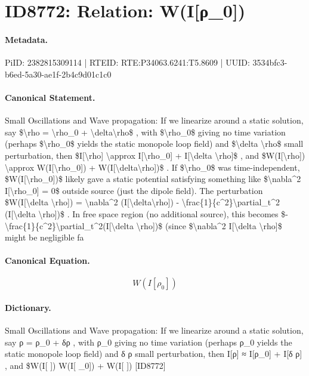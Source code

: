 \section*{ID8772: Relation: W(I[ρ\_0])}
\paragraph{Metadata.}
PiID: 2382815309114 | RTEID: RTE:P34063.6241:T5.8609 | UUID: 3534bfc3-b6ed-5a30-ae1f-2b4c9d01c1c0

\paragraph{Canonical Statement.}
Small Oscillations and Wave propagation: If we linearize around a static solution, say \$\textbackslash{}rho = \textbackslash{}rho\_0 + \textbackslash{}delta\textbackslash{}rho\$ , with \$\textbackslash{}rho\_0\$ giving no time variation (perhaps \$\textbackslash{}rho\_0\$ yields the static monopole loop field) and \$\textbackslash{}delta \textbackslash{}rho\$ small perturbation, then \$I[\textbackslash{}rho] \textbackslash{}approx I[\textbackslash{}rho\_0] + I[\textbackslash{}delta \textbackslash{}rho]\$ , and \$W(I[\textbackslash{}rho]) \textbackslash{}approx W(I[\textbackslash{}rho\_0]) + W(I[\textbackslash{}delta\textbackslash{}rho])\$ . If \$\textbackslash{}rho\_0\$ was time-independent, \$W(I[\textbackslash{}rho\_0])\$ likely gave a static potential satisfying something like \$\textbackslash{}nabla\textasciicircum{}2 I[\textbackslash{}rho\_0] = 0\$ outside source (just the dipole field). The perturbation \$W(I[\textbackslash{}delta \textbackslash{}rho]) = \textbackslash{}nabla\textasciicircum{}2 (I[\textbackslash{}delta\textbackslash{}rho]) - \textbackslash{}frac\{1\}\{c\textasciicircum{}2\}\textbackslash{}partial\_t\textasciicircum{}2 (I[\textbackslash{}delta \textbackslash{}rho])\$ . In free space region (no additional source), this becomes \$-\textbackslash{}frac\{1\}\{c\textasciicircum{}2\}\textbackslash{}partial\_t\textasciicircum{}2(I[\textbackslash{}delta \textbackslash{}rho])\$ (since \$\textbackslash{}nabla\textasciicircum{}2 I[\textbackslash{}delta \textbackslash{}rho]\$ might be negligible fa

\paragraph{Canonical Equation.}
\[
W(I[\rho_0])
\]

\paragraph{Dictionary.}
Small Oscillations and Wave propagation: If we linearize around a static solution, say ρ = ρ\_0 + δρ , with ρ\_0 giving no time variation (perhaps ρ\_0 yields the static monopole loop field) and δ ρ small perturbation, then I[ρ] ≈ I[ρ\_0] + I[δ ρ] , and \$W(I[ ]) W(I[ \_0]) + W(I[ ]) [ID8772]

